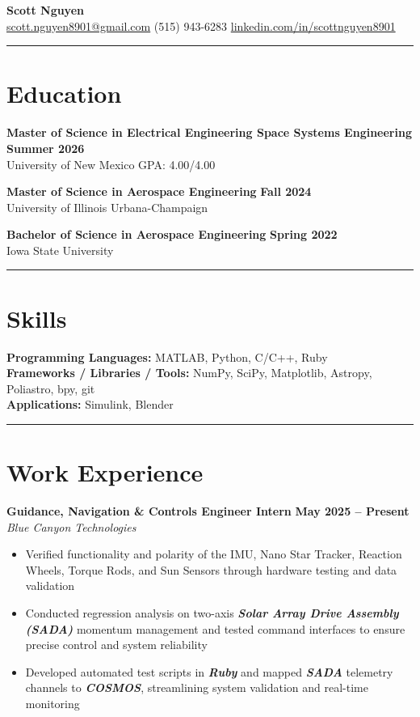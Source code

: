\documentclass[10pt]{article}
\newcommand{\sectionline}{\noindent\rule{\linewidth}{0.4pt}}
\begin{document}
	
	\begin{center}
		{\color{mygreen}
			{\Huge \textbf{Scott Nguyen}} \\
			\href{mailto:scott.nguyen8901@gmail.com}{scott.nguyen8901@gmail.com} \quad \textbar \quad 
			(515) 943-6283 \quad \textbar \quad 
			\href{https://www.linkedin.com/in/scottnguyen8901/}{linkedin.com/in/scottnguyen8901}
		}
	\end{center}
	
	\sectionline
	
	\section*{Education}
	
	\textbf{Master of Science in Electrical Engineering \textbar Space Systems Engineering} \hfill \textbf{Summer 2026} \\
	University of New Mexico \hfill GPA: 4.00/4.00
	
	\textbf{Master of Science in Aerospace Engineering} \hfill \textbf{Fall 2024} \\
	University of Illinois Urbana-Champaign
	
	\textbf{Bachelor of Science in Aerospace Engineering} \hfill \textbf{Spring 2022} \\
	Iowa State University
	
	\sectionline
	
	\section*{Skills}
	\textbf{Programming Languages:} MATLAB, Python, C/C++, Ruby \\
	\textbf{Frameworks / Libraries / Tools:} NumPy, SciPy, Matplotlib, Astropy, Poliastro, bpy, git \\
	\textbf{Applications:} Simulink, Blender
	
	\sectionline
	
	\section*{Work Experience}
	
	\textbf{Guidance, Navigation \& Controls Engineer Intern} \hfill \textbf{May 2025 – Present} \\
	\emph{Blue Canyon Technologies}
	\begin{itemize}
	    \item Verified functionality and polarity of the IMU, Nano Star Tracker, Reaction Wheels, Torque Rods, and Sun Sensors through hardware testing and data validation
	    \item Conducted regression analysis on two-axis \textbf{\emph{Solar Array Drive Assembly (SADA)}} momentum management and tested command interfaces to ensure 			   precise control and system reliability
	    \item Developed automated test scripts in \textbf{\emph{Ruby}} and mapped \textbf{\emph{SADA}} telemetry channels to \textbf{\emph{COSMOS}}, streamlining system 		    validation and real-time monitoring
	\end{itemize}
\end{document}
